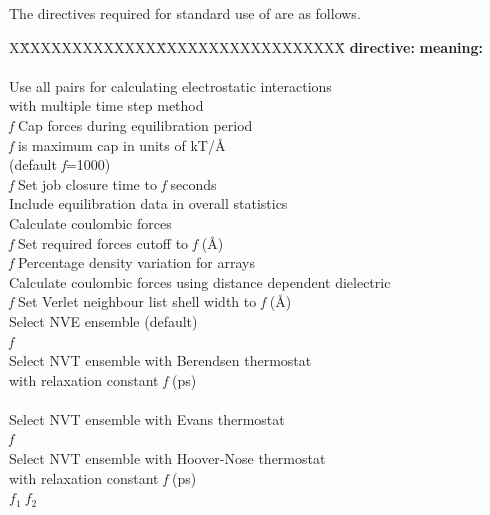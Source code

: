 The directives required for standard use of \DD are as follows.

\begin{tabbing}
X\=XXXXXXXXXXXXX\=XXXXXXXXXXXXXXXXXX\=\kill
\> {\bf directive:} \> {\bf meaning:} \\
\> ~ \> \\
 \> Use all pairs for calculating
electrostatic interactions\\
\>                 \> with multiple time step method\\
 {\em f}\> Cap forces during equilibration period\\
\>                 \> {\em f} is maximum cap in units of kT/\AA\\
\>                 \> (default {\em f}=1000)\\
 {\em f} \> Set job closure time to {\em f}
seconds\\
 \> Include equilibration data in overall statistics \\
 \> Calculate coulombic forces \\
  {\em f}  \> Set required forces cutoff to {\em f} (\AA)
\\
  {\em f}  \> Percentage density variation for arrays\\
 \> Calculate coulombic forces using distance dependent
dielectric\\
 {\em f} \> Set Verlet neighbour list shell width to {\em
f} (\AA) \\
 \> Select NVE ensemble (default) \\
 {\em f} \\
\> \> Select NVT ensemble with Berendsen thermostat\\
\> \> with relaxation constant {\em f} (ps) \\
 \\
\> \> Select NVT ensemble with Evans thermostat\\
 {\em f}\\
\> \> Select NVT ensemble with Hoover-Nose thermostat\\
\> \> with relaxation constant {\em f} (ps) \\
 $f_{1}~f_{2}$ \\

\end{tabbing}
